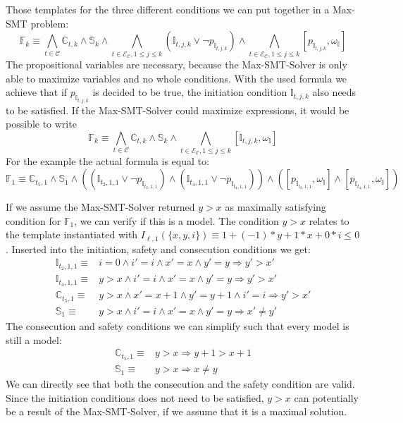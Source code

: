 Those templates for the three different conditions we can put together in a Max-SMT problem:
\[ \mathbb{F}_k \equiv \bigwedge_{t \in \mathcal{C}} \mathbb{C}_{t, k} \wedge \mathbb{S}_k \wedge \bigwedge_{t \in \mathcal{E}_\mathcal{C}, 1 \leq j \leq k}{(\mathbb{I}_{t,j,k} \vee \neg p_{\mathbb{I}_{t,j,k}})} \wedge \bigwedge_{t \in \mathcal{E}_\mathcal{C}, 1 \leq j \leq k}{[p_{\mathbb{I}_{t,j,k}}, \omega_\mathbb{I}]} \]
The propositional variables are necessary, because the Max-SMT-Solver is only able to maximize variables and no whole conditions.
With the used formula we achieve that if $p_{\mathbb{I}_{t,j,k}}$ is decided to be true, the initiation condition $\mathbb{I}_{t,j,k}$ also needs to be satisfied.
If the Max-SMT-Solver could maximize expressions, it would be possible to write
\[ \mathbb{F}_k \equiv \bigwedge_{t \in \mathcal{C}} \mathbb{C}_{t, k} \wedge \mathbb{S}_k \wedge \bigwedge_{t \in \mathcal{E}_\mathcal{C}, 1 \leq j \leq k}{[\mathbb{I}_{t,j,k}, \omega_\mathbb{I}]} \]
For the example the actual formula is equal to:
\[ \mathbb{F}_1 \equiv \mathbb{C}_{t_5, 1} \wedge \mathbb{S}_1 \wedge ((\mathbb{I}_{t_2,1,1} \vee \neg p_{\mathbb{I}_{t_2,1,1}}) \wedge (\mathbb{I}_{t_4,1,1} \vee \neg p_{\mathbb{I}_{t_4,1,1}})) \wedge ([p_{\mathbb{I}_{t_2,1,1}}, \omega_\mathbb{I}] \wedge [p_{\mathbb{I}_{t_4,1,1}}, \omega_\mathbb{I}]) \]

If we assume the Max-SMT-Solver returned $y > x$ as maximally satisfying condition for $\mathbb{F}_1$, we can verify if this is a model.
The condition $y > x$ relates to the template instantiated with $I_{\ell,1}(\lbrace x, y, i \rbrace) \equiv 1 + (-1) * y + 1 * x + 0 * i \leq 0$.
Inserted into the initiation, safety and consecution conditions we get:
\begin{align}
  \mathbb{I}_{t_2, 1, 1} \equiv & i = 0 \wedge i' = i \wedge x' = x \wedge y' = y \Rightarrow y' > x'\\
  \mathbb{I}_{t_4, 1, 1} \equiv & y > x \wedge i' = i \wedge x' = x \wedge y' = y \Rightarrow y' > x'\\
  \mathbb{C}_{t_5, 1} \equiv & y > x \wedge x' = x + 1 \wedge y' = y + 1 \wedge i' = i \Rightarrow y' > x'\\
  \mathbb{S}_1 \equiv & y > x \wedge i' = i \wedge x' = x \wedge y' = y \Rightarrow x' \neq y'
\end{align}
The consecution and safety conditions we can simplify such that every model is still a model:
\begin{align}
  \mathbb{C}_{t_5, 1} \equiv & y > x \Rightarrow y + 1 > x + 1\\
  \mathbb{S}_1 \equiv & y > x \Rightarrow x \neq y
\end{align}
We can directly see that both the consecution and the safety condition are valid.
Since the initiation conditions does not need to be satisfied, $y > x$ can potentially be a result of the Max-SMT-Solver, if we assume that it is a maximal solution.

